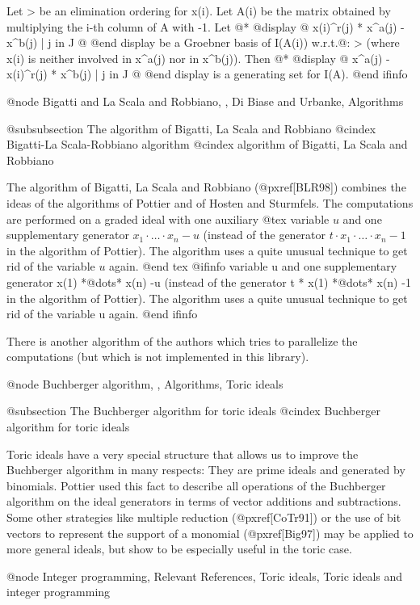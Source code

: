 Let > be an elimination ordering for x(i). Let A(i) be the matrix
obtained by multiplying the i-th column of A with -1. Let @*
@display
@{ x(i)^r(j) * x^a(j) - x^b(j) | j in J @}
@end display
be a Groebner basis of I(A(i)) w.r.t.@: > (where x(i) is neither
involved in x^a(j) nor in x^b(j)). Then @*
@display
@{ x^a(j) - x(i)^r(j) * x^b(j) | j in J @}
@end display
is a generating set for I(A).
@end ifinfo

@node Bigatti and La Scala and Robbiano, , Di Biase and Urbanke, Algorithms

@subsubsection The algorithm of Bigatti, La Scala and Robbiano
@cindex Bigatti-La Scala-Robbiano algorithm
@cindex algorithm of Bigatti, La Scala and Robbiano

The algorithm of Bigatti, La Scala and Robbiano (@pxref{[BLR98]}) combines the ideas of
the algorithms of Pottier and of Hosten and Sturmfels. The
computations are performed on a graded ideal with one auxiliary
@tex
variable $u$ and one supplementary generator $x_1\cdot\ldots\cdot x_n -
u$ (instead of the generator $t\cdot x_1\cdot\ldots\cdot x_n -1$ in
the algorithm of Pottier). The algorithm uses a quite unusual technique to
get rid of the variable $u$ again.
@end tex
@ifinfo
variable u and one supplementary generator x(1) *@dots{}* x(n) -u (instead of the
generator t * x(1) *@dots{}* x(n) -1 in
the algorithm of Pottier). The algorithm uses a quite unusual technique to
get rid of the variable u again.
@end ifinfo

There is another algorithm of the authors which tries to parallelize
the computations (but which is not implemented in this library).

@node Buchberger algorithm, , Algorithms, Toric ideals

@subsection The Buchberger algorithm for toric ideals
@cindex Buchberger algorithm for toric ideals

Toric ideals have a very special structure that allows us to improve
the Buchberger algorithm in many respects: They are prime ideals and
generated by binomials. Pottier used this fact to describe all
operations of the Buchberger algorithm on the ideal generators in terms
of vector additions and subtractions. Some other strategies like
multiple reduction (@pxref{[CoTr91]}) or the use of bit
vectors to represent the support of a monomial (@pxref{[Big97]}) may be
applied to more general ideals, but show to
be especially useful in the toric case.

@node Integer programming, Relevant References, Toric ideals, Toric ideals and integer programming

